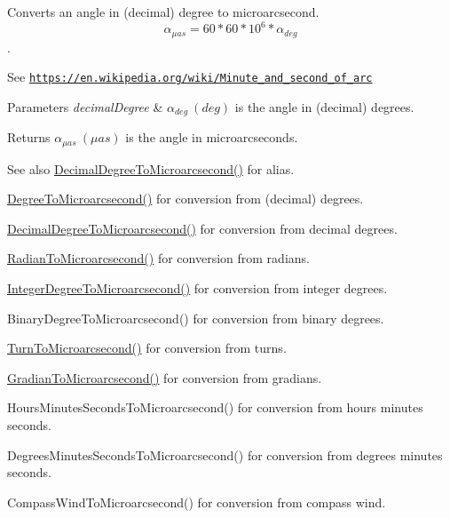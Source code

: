 Converts an angle in (decimal) degree to microarcsecond. \[\alpha_{\mu as}=60 * 60 * 10^6 * \alpha_{deg}\]. 

See \href{https://en.wikipedia.org/wiki/Minute_and_second_of_arc}{\tt https\+://en.\+wikipedia.\+org/wiki/\+Minute\+\_\+and\+\_\+second\+\_\+of\+\_\+arc} 
\begin{DoxyParams}{Parameters}
{\em decimal\+Degree} & $\alpha_{deg}\ (deg)$ is the angle in (decimal) degrees. \\
\hline
\end{DoxyParams}
\begin{DoxyReturn}{Returns}
$\alpha_{\mu as}\ (\mu as)$ is the angle in microarcseconds. 
\end{DoxyReturn}
\begin{DoxySeeAlso}{See also}
\mbox{\hyperlink{group___e_g_x_math-_angle_conversions-_decimal_degree_ga6fa88456069907fd24716fa575517571}{Decimal\+Degree\+To\+Microarcsecond()}} for alias. 

\mbox{\hyperlink{group___e_g_x_math-_angle_conversions-_degree_ga31b65388fe1b4656663b3d66b9d764e6}{Degree\+To\+Microarcsecond()}} for conversion from (decimal) degrees. 

\mbox{\hyperlink{group___e_g_x_math-_angle_conversions-_decimal_degree_ga6fa88456069907fd24716fa575517571}{Decimal\+Degree\+To\+Microarcsecond()}} for conversion from decimal degrees. 

\mbox{\hyperlink{group___e_g_x_math-_angle_conversions-_radian_ga3a515ca2838a305fa40750763f546a86}{Radian\+To\+Microarcsecond()}} for conversion from radians. 

\mbox{\hyperlink{group___e_g_x_math-_angle_conversions-_integer_degree_ga69179d6082764595c7014805e1f6b31e}{Integer\+Degree\+To\+Microarcsecond()}} for conversion from integer degrees. 

Binary\+Degree\+To\+Microarcsecond() for conversion from binary degrees. 

\mbox{\hyperlink{group___e_g_x_math-_angle_conversions-_turn_ga41a861a04d65aab05647b32142e6d80d}{Turn\+To\+Microarcsecond()}} for conversion from turns. 

\mbox{\hyperlink{group___e_g_x_math-_angle_conversions-_gradian_gab7781c860ea3ab9c9cf76ab639846a07}{Gradian\+To\+Microarcsecond()}} for conversion from gradians. 

Hours\+Minutes\+Seconds\+To\+Microarcsecond() for conversion from hours minutes seconds. 

Degrees\+Minutes\+Seconds\+To\+Microarcsecond() for conversion from degrees minutes seconds. 

Compass\+Wind\+To\+Microarcsecond() for conversion from compass wind. 
\end{DoxySeeAlso}
\mbox{\label{group___e_g_x_math-_angle_conversions-_degree_ga2c218e286b2ef72a00734dbc5a7f5ab6}} 
